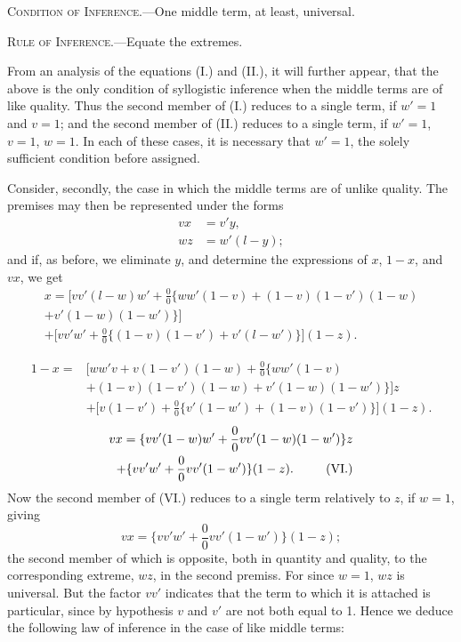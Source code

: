 \documentclass[oneside]{book}
\begin{document}
\textsc{Condition of Inference.}---One middle term, at least, universal.

\textsc{Rule of Inference.}---Equate the extremes.

From an analysis of the equations (I.) and (II.), it will further
appear, that the above is the only condition of syllogistic inference
when the middle terms are of like quality. Thus the
second member of (I.) reduces to a single term, if $w' = 1$ and
$v = 1$; and the second member of (II.) reduces to a single term,
if $w' = 1$, $v = 1$, $w = 1$. In each of these cases, it is necessary that
$w' = 1$, the solely sufficient condition before assigned.

Consider, secondly, the case in which the middle terms are
of unlike quality. The premises may then be represented under
the forms
\begin{align*}
  vx &= v'y,        \tag{4}   \\
  wz &= w'(l-y);     \tag{5}
\end{align*}
and if, as before, we eliminate $y$, and determine the expressions
of $x$, $1-x$, and $vx$, we get
\begin{multline*}
x= \bigl[vv'(l-w)w' +\frac{0}{0}\{ww'(1-v) + (1-v)(1-v')(1-w)  \\
  + v'(1-w)(1-w')\}\bigr]   \\
+ \bigl[vv'w' +\frac{0}{0}\{(1-v)(1-v') + v'(l-w')\}\bigr](1-z). \tag{IV.}
\end{multline*}

\begin{align*}
  1-x = &\bigl[ww'v + v(1-v')(1-w) + \frac{0}{0}\{ww'(1-v)   \\
    &+ (1-v)(1-v')(1-w) + v'(1-w)(1-w')\}\bigr]z   \\
    &+ \bigl[v(1-v') + \frac{0}{0}\{v'(1-w') + (1-v)(1-v')\}\bigr](1-z).
\tag{V.}
\end{align*}
\begin{multline*}
  vx = \{vv'(1-w)w' + \frac{0}{0}vv'(1-w)(1-w')\}z   \\
    \hfill + \{vv'w' + \frac{0}{0}vv'(1-w')\}(1-z). \hfill \tag{VI.}
\end{multline*}
Now the second member of (VI.) reduces to a single term relatively to $z$, if $w = 1$, giving
\[
  vx = \{vv'w' + \frac{0}{0}vv'(1-w')\}(1-z);
\]
the second member of which is opposite, both in quantity and
quality, to the corresponding extreme, $wz$, in the second premiss.
For since $w = 1$, $wz$ is universal. But the factor $vv'$ indicates
that the term to which it is attached is particular, since by hypothesis $v$ and $v'$ are not both equal to 1. Hence we deduce the
following law of inference in the case of like middle terms:
\end{document}
